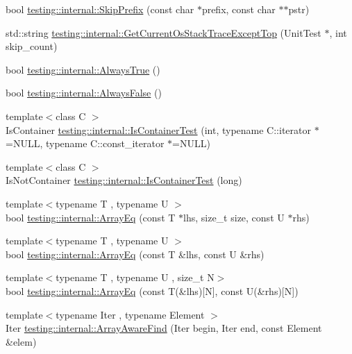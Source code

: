 \begin{DoxyCompactItemize}
\item 
bool \hyperlink{namespacetesting_1_1internal_a244d9a3765727306b597b8992ab84036}{testing\-::internal\-::\-Skip\-Prefix} (const char $\ast$prefix, const char $\ast$$\ast$pstr)
\item 
std\-::string \hyperlink{namespacetesting_1_1internal_a7ca65eb9f24d89fbc1e8cb108d3c6339}{testing\-::internal\-::\-Get\-Current\-Os\-Stack\-Trace\-Except\-Top} (Unit\-Test $\ast$, int skip\-\_\-count)
\item 
bool \hyperlink{namespacetesting_1_1internal_a922c9da63cd4bf94fc473b9ecac76414}{testing\-::internal\-::\-Always\-True} ()
\item 
bool \hyperlink{namespacetesting_1_1internal_a4b24c851ab13569b1b15b3d259b60d2e}{testing\-::internal\-::\-Always\-False} ()
\item 
{\footnotesize template$<$class C $>$ }\\Is\-Container \hyperlink{namespacetesting_1_1internal_acb6ea1086293c1d6636e3c67941351fb}{testing\-::internal\-::\-Is\-Container\-Test} (int, typename C\-::iterator $\ast$=N\-U\-L\-L, typename C\-::const\-\_\-iterator $\ast$=N\-U\-L\-L)
\item 
{\footnotesize template$<$class C $>$ }\\Is\-Not\-Container \hyperlink{namespacetesting_1_1internal_af545a2ae928b8a9e7581978234464275}{testing\-::internal\-::\-Is\-Container\-Test} (long)
\item 
{\footnotesize template$<$typename T , typename U $>$ }\\bool \hyperlink{namespacetesting_1_1internal_af4bebf36baf0b0a5b26d051dde55fa47}{testing\-::internal\-::\-Array\-Eq} (const T $\ast$lhs, size\-\_\-t size, const U $\ast$rhs)
\item 
{\footnotesize template$<$typename T , typename U $>$ }\\bool \hyperlink{namespacetesting_1_1internal_a49b4d0ee49c0f8c93bab29ebd20630cc}{testing\-::internal\-::\-Array\-Eq} (const T \&lhs, const U \&rhs)
\item 
{\footnotesize template$<$typename T , typename U , size\-\_\-t N$>$ }\\bool \hyperlink{namespacetesting_1_1internal_a5cb6f81ee827130024261121c742b26c}{testing\-::internal\-::\-Array\-Eq} (const T(\&lhs)\mbox{[}N\mbox{]}, const U(\&rhs)\mbox{[}N\mbox{]})
\item 
{\footnotesize template$<$typename Iter , typename Element $>$ }\\Iter \hyperlink{namespacetesting_1_1internal_a94a857fe6ff32cf4fdc4769a4071f239}{testing\-::internal\-::\-Array\-Aware\-Find} (Iter begin, Iter end, const Element \&elem)
$$
\end{DoxyCompactItemize}
